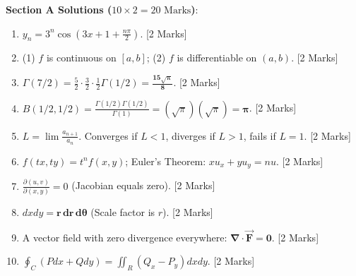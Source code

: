 \begin{solutionbox}
\noindent\textbf{Section A Solutions ($10 \times 2 = 20\text{ Marks}$)}:
\begin{enumerate}
    \item $y_n = 3^n \cos\left(3x + 1 + \frac{n\pi}{2}\right)$. [2 Marks]
    \item (1) $f$ is continuous on ${[a,b]}$; (2) $f$ is differentiable on $(a,b)$. [2 Marks]
    \item $\Gamma(7/2) = \frac{5}{2} \cdot \frac{3}{2} \cdot \frac{1}{2}\Gamma(1/2) = \mathbf{\frac{15\sqrt{\pi}}{8}}$. [2 Marks]
    \item $B(1/2, 1/2) = \frac{\Gamma(1/2)\Gamma(1/2)}{\Gamma(1)} = (\sqrt{\pi})(\sqrt{\pi}) = \mathbf{\pi}$. [2 Marks]
    \item $L = \lim \frac{a_{n+1}}{a_n}$. Converges if $L < 1$, diverges if $L > 1$, fails if $L = 1$. [2 Marks]
    \item $f(tx,ty) = t^n f(x,y)$; Euler's Theorem: $x u_x + y u_y = n u$. [2 Marks]
    \item $\frac{\partial(u,v)}{\partial(x,y)} = 0$ (Jacobian equals zero). [2 Marks]
    \item $dx dy = \mathbf{r\,dr\,d\theta}$ (Scale factor is $r$). [2 Marks]
    \item A vector field with zero divergence everywhere: $\mathbf{\nabla\cdot\vec{F} = 0}$. [2 Marks]
    \item $\oint_C (P dx + Q dy) = \iint_R (Q_x - P_y) dx dy$. [2 Marks]
\end{enumerate}


\end{solutionbox}
